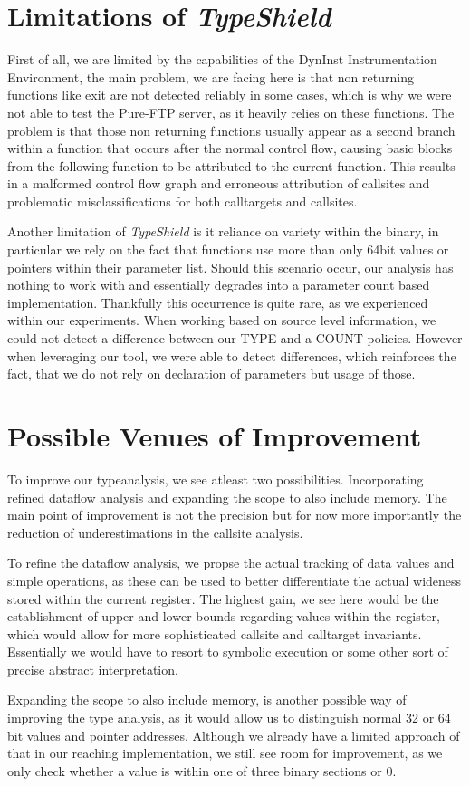 \section{Limitations of \textit{TypeShield}}
\label{section:limit}
First of all, we are limited by the capabilities of the DynInst Instrumentation Environment, the main problem, we are facing here is that non returning functions like exit are not detected reliably in some cases, which is why we were not able to test the Pure-FTP server, as it heavily relies on these functions. The problem is that those non returning functions usually appear as a second branch within a function that occurs after the normal control flow, causing basic blocks from the following function to be attributed to the current function. This results in a malformed control flow graph and erroneous attribution of callsites and problematic misclassifications for both calltargets and callsites.

Another limitation of \textit{TypeShield} is it reliance on variety within the binary, in particular we rely on the fact that functions use more than only 64bit values or pointers within their parameter list. Should this scenario occur, our analysis has nothing to work with and essentially degrades into a parameter count based implementation. Thankfully this occurrence is quite rare, as we experienced within our experiments. When working based on source level information, we could not detect a difference between our TYPE and a COUNT policies. However when leveraging our tool, we were able to detect differences, which reinforces the fact, that we do not rely on declaration of parameters but usage of those.


\section{Possible Venues of Improvement}
\label{section:venuesimp}
To improve our typeanalysis, we see atleast two possibilities. Incorporating refined dataflow analysis and expanding the scope to also include memory. The main point of improvement is not the precision but for now more importantly the reduction of underestimations in the callsite analysis.

To refine the dataflow analysis, we propse the actual tracking of data values and simple operations, as these can be used to better differentiate the actual wideness stored within the current register. The highest gain, we see here would be the establishment of upper and lower bounds regarding values within the register, which would allow for more sophisticated callsite and calltarget invariants. Essentially we would have to resort to symbolic execution or some other sort of precise abstract interpretation.

Expanding the scope to also include memory, is another possible way of improving the type analysis, as it would allow us to distinguish normal 32 or 64 bit values and pointer addresses. Although we already have a limited approach of that in our reaching implementation, we still see room for improvement, as we only check whether a value is within one of three binary sections or 0.
